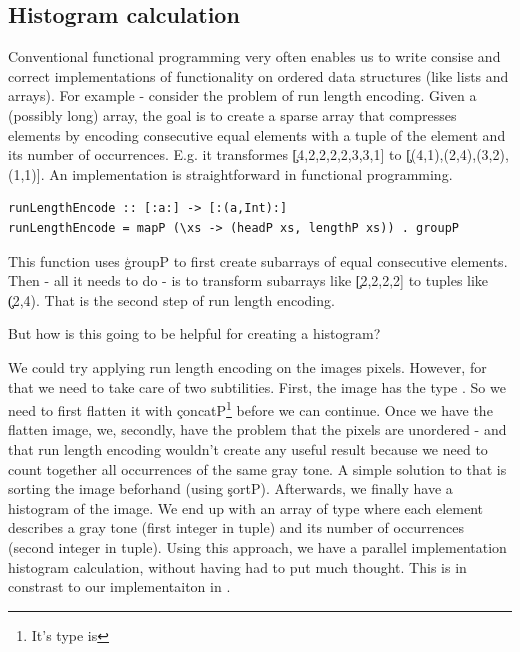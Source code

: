  \subsection{Histogram calculation}
    Conventional functional programming very often enables us to write
    consise and correct implementations of functionality on ordered
    data structures (like lists and arrays). For example - consider the problem of run length encoding.
    Given a (possibly long) array, the goal is to create a sparse array
    that compresses elements by encoding consecutive equal elements
    with a tuple of the element and its number of occurrences.
    E.g. it transformes \c{[4,2,2,2,2,3,3,1]} to \c{[(4,1),(2,4),(3,2),(1,1)]}.
    An implementation is straightforward in functional programming.
    \begin{lstlisting}
runLengthEncode :: [:a:] -> [:(a,Int):]
runLengthEncode = mapP (\xs -> (headP xs, lengthP xs)) . groupP
    \end{lstlisting}
    This function uses \c{groupP} to first create subarrays of
    equal consecutive elements. Then - all it needs to do - is to
    transform subarrays like \c{[2,2,2,2]} to tuples like \c{(2,4)}.
    That is the second step of run length encoding.
    
    But how is this going to be helpful for creating a histogram?
    
    We could try applying run length encoding on the images pixels. However,
    for that we need to take care of two subtilities. First, the image
    has the type \type{[:[:a:]:]}. So we need to first flatten
    it with \c{concatP}\footnote{It's type is \type{[:[:a:]:] -> [:a:]}}
    before we can continue. Once we have the flatten image,
    we, secondly, have the problem that the pixels are unordered - 
    and that run length encoding wouldn't create any useful result 
    because we need to count together all occurrences of the same
    gray tone. A simple solution to that is sorting the image beforhand (using \c{sortP}).
    Afterwards, we finally have a histogram of the image.
    We end up with an array of type  where each element
    describes a gray tone (first integer in tuple) and its number of
    occurrences (second integer in tuple).
    Using this approach, we have a parallel implementation histogram calculation,
    without having had to put much thought. This is in constrast
    to our implementaiton in \man.
    
